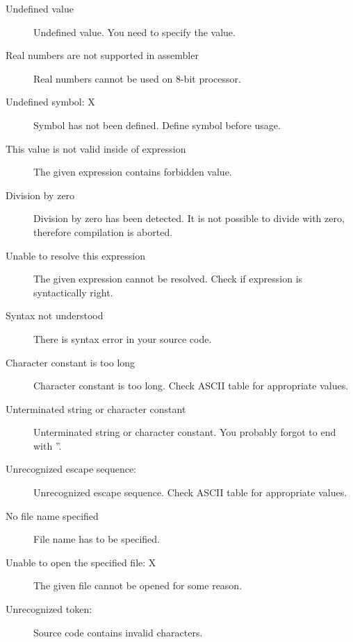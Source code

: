 \begin{description}
            \item[Undefined value ]
                Undefined value. You need to specify the value.
            \item[Real numbers are not supported in assembler ]
                Real numbers cannot be used on 8-bit processor.
            \item[Undefined symbol: X ]
                Symbol has not been defined. Define symbol before usage.
            \item[This value is not valid inside of expression ]
                The given expression contains forbidden value.
            \item[Division by zero ]
                Division by zero has been detected. It is not possible to divide with zero, therefore compilation is aborted.
            \item[Unable to resolve this expression ]
                The given expression cannot be resolved. Check if expression is syntactically right.
            \item[Syntax not understood ]
                There is syntax error in your source code.
            \item[Character constant is too long ]
                Character constant is too long. Check ASCII table for appropriate values.
            \item[Unterminated string or character constant ]
                Unterminated string or character constant. You probably forgot to end with ''.
            \item[Unrecognized escape sequence: ]
                Unrecognized escape sequence. Check ASCII table for appropriate values.
            \item[No file name specified ]
                File name has to be specified.
            \item[Unable to open the specified file: X]
                The given file cannot be opened for some reason.
            \item[Unrecognized token:  ]
                Source code contains invalid characters.
        \end{description}

